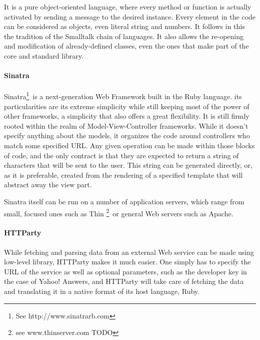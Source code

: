 It is a pure object-oriented language, where every method or function is actually activated by sending a message to the desired instance. Every element in the code can be considered as objects, even literal string and numbers. It follows in this the tradition of the Smalltalk chain of languages. It also allows the re-opening and modification of already-defined classes, even the ones that make part of the core and standard library.


\paragraph{Sinatra} %
\label{par:sinatra}

Sinatra\footnote{See http://www.sinatrarb.com}\ is a next-generation Web Framework built in the Ruby language. its particularities are its extreme simplicity while still keeping most of the power of other frameworks, a simplicity that also offers a great flexibility. It is still firmly rooted within the realm of Model-View-Controller frameworks. While it doesn't specify anything about the models, it organizes the code around controllers who match some specified URL. Any given operation can be made within those blocks of code, and the only contract is that they are expected to return a string of characters that will be sent to the user. This string can be generated directly, or, as it is preferable, created from the rendering of a specified template that will abstract away the view part.

Sinatra itself can be run on a number of application servers, which range from small, focused ones such as Thin \footnote{see www.thinserver.com TODO}\ or general Web servers such as Apache.


\paragraph{HTTParty} %
\label{par:httparty}

While fetching and parsing data from an external Web service can be made using low-level library, HTTParty makes it much easier. One simply has to specify the URL of the service as well as optional parameters, such as the developer key in the case of Yahoo! Answers, and HTTParty will take care of fetching the data and translating it in a native format of its host language, Ruby.

